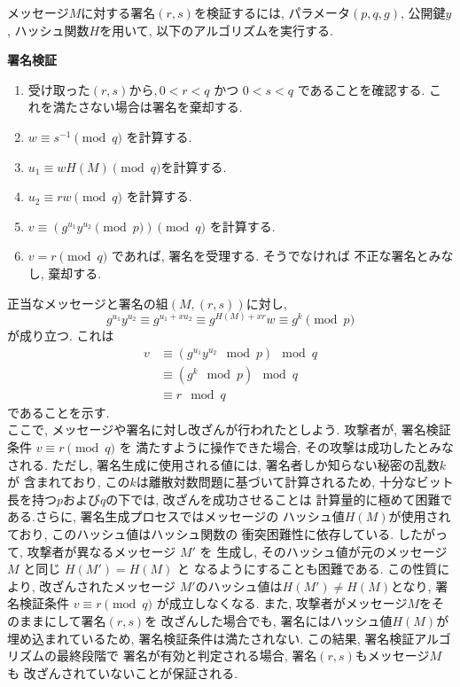 \vspace{1em}
メッセージ$M$に対する署名$(r, s)$を検証するには, パラメータ$(p,q,g)$, 
公開鍵$y$, ハッシュ関数$H$を用いて, 以下のアルゴリズムを実行する.
\vspace{1em}
\let\ltxlist\list
\begin{breakitembox}[l]{\textbf{署名検証}}
  　
  \begin{enumerate}[parsep=7pt]
    \item 受け取った$(r,s)から, $$0<r<q$ かつ $0<s<q$ であることを確認する. 
    これを満たさない場合は署名を棄却する.
    \item $w\equiv s^{-1}\pmod q$ を計算する.
    \item $u_1\equiv wH(M)\pmod q$を計算する.
    \item $u_2\equiv rw\pmod q$ を計算する.
    \item $v\equiv (g^{u_1}y^{u_2}\pmod p)\pmod q$ を計算する.
    \item $v=r\pmod  q$ であれば, 署名を受理する. そうでなければ
    不正な署名とみなし, 棄却する.
  \end{enumerate}
\end{breakitembox}
\vspace{1em}
\indent 正当なメッセージと署名の組$(M, (r, s))$に対し, 
\[
  g^{u_1}y^{u_2}\equiv g^{u_1+xu_2} \equiv g^{H(M)+xr}w\equiv g^{k}\pmod p
\]
が成り立つ. これは 
\begin{align*}
  v &\equiv (g^{u_1}y^{u_2} \mod p) \mod q \\
    &\equiv (g^k \mod p) \mod q \\
    &\equiv r \mod q
\end{align*}
であることを示す.\\
\indent ここで, メッセージや署名に対し改ざんが行われたとしよう. 
攻撃者が, 署名検証条件 $v \equiv r \pmod{q}$ を
満たすように操作できた場合, その攻撃は成功したとみなされる. ただし, 
署名生成に使用される値には, 署名者しか知らない秘密の乱数$k$が
含まれており, この$k$は離散対数問題に基づいて計算されるため, 
十分なビット長を持つ$p$および$q$の下では, 改ざんを成功させることは
計算量的に極めて困難である.さらに, 署名生成プロセスではメッセージの
ハッシュ値$H(M)$が使用されており, このハッシュ値はハッシュ関数の
衝突困難性に依存している. したがって, 攻撃者が異なるメッセージ $M'$ を
生成し, そのハッシュ値が元のメッセージ $M$ と同じ $H(M') = H(M)$ と
なるようにすることも困難である. この性質により, 改ざんされたメッセージ
$M'$のハッシュ値は$H(M')\neq H(M)$となり, 
署名検証条件 $v \equiv r \pmod{q}$ が成立しなくなる.
また, 攻撃者がメッセージ$M$をそのままにして署名$(r, s)$を
改ざんした場合でも, 署名にはハッシュ値$H(M)$が埋め込まれているため, 
署名検証条件は満たされない. この結果, 署名検証アルゴリズムの最終段階で
署名が有効と判定される場合, 署名$(r, s)$もメッセージ$M$も
改ざんされていないことが保証される.


